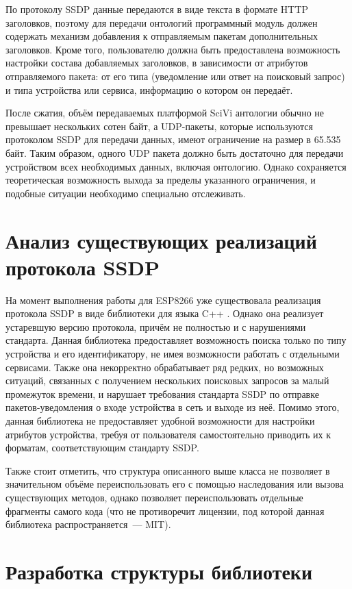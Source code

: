 По протоколу SSDP данные передаются в виде текста в формате HTTP заголовков, поэтому для передачи онтологий программный модуль должен содержать механизм добавления к отправляемым пакетам дополнительных заголовков.
Кроме того, пользователю должна быть предоставлена возможность настройки состава добавляемых заголовков, в зависимости от атрибутов отправляемого пакета: от его типа (уведомление или ответ на поисковый запрос) и типа устройства или сервиса, информацию о котором он передаёт.

После сжатия, объём передаваемых платформой SciVi антологии обычно не превышает нескольких сотен байт, а UDP-пакеты, которые используются протоколом SSDP для передачи данных, имеют ограничение на размер в 65.535 байт.
Таким образом, одного UDP пакета должно быть достаточно для передачи устройством всех необходимых данных, включая онтологию.
Однако сохраняется теоретическая возможность выхода за пределы указанного ограничения, и подобные ситуации необходимо специально отслеживать.

\section{Анализ существующих реализаций протокола SSDP}

На момент выполнения работы для ESP8266 уже существовала реализация протокола SSDP в виде библиотеки для языка C++ \cite{web:esp-ssdp}.
Однако она реализует устаревшую версию протокола, причём не полностью и с нарушениями стандарта.
Данная библиотека предоставляет возможность поиска только по типу устройства и его идентификатору, не имея возможности работать с отдельными сервисами.
Также она некорректно обрабатывает ряд редких, но возможных ситуаций, связанных с получением нескольких поисковых запросов за малый промежуток времени, и нарушает требования стандарта SSDP по отправке пакетов-уведомления о входе устройства в сеть и выходе из неё.
Помимо этого, данная библиотека не предоставляет удобной возможности для настройки атрибутов устройства, требуя от пользователя самостоятельно приводить их к форматам, соответствующим стандарту SSDP.

Также стоит отметить, что структура описанного выше класса не позволяет в значительном объёме переиспользовать его с помощью наследования или вызова существующих методов, однако позволяет переиспользовать отдельные фрагменты самого кода (что не противоречит лицензии, под которой данная библиотека распространяется~--- MIT).

\section{Разработка структуры библиотеки}

